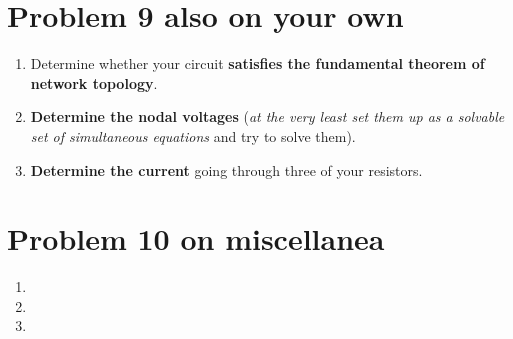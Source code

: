 \documentclass[11pt]{book}
\begin{document}
\section{Problem 9 also on your own}

\begin{enumerate}
	\item Determine whether your circuit \textbf{satisfies the fundamental theorem of network topology}.
	\item \textbf{Determine the nodal voltages} (\textit{at the very least set them up as a solvable set of simultaneous equations} and try to solve them).
	\item \textbf{Determine the current} going through three of your resistors.
\end{enumerate}

\section{Problem 10 on miscellanea}
\begin{enumerate}
	\item 
	\item 
	\item 
\end{enumerate}


\newpage
\end{document}
